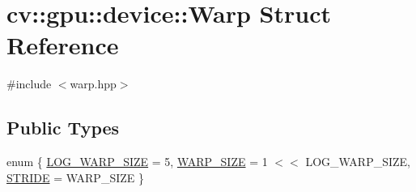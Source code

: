 \hypertarget{structcv_1_1gpu_1_1device_1_1Warp}{\section{cv\-:\-:gpu\-:\-:device\-:\-:Warp Struct Reference}
\label{structcv_1_1gpu_1_1device_1_1Warp}
}


{\ttfamily \#include $<$warp.\-hpp$>$}

\subsection*{Public Types}
\begin{DoxyCompactItemize}
\item 
enum \{ \hyperlink{structcv_1_1gpu_1_1device_1_1Warp_aad40243792fd09d3a4589e2751c91f67ae2742eb9f126ca1c5e1c775dfee90a1f}{L\-O\-G\-\_\-\-W\-A\-R\-P\-\_\-\-S\-I\-Z\-E} = 5, 
\hyperlink{structcv_1_1gpu_1_1device_1_1Warp_aad40243792fd09d3a4589e2751c91f67a5c15f55700844c8c3d7b0254964dfe36}{W\-A\-R\-P\-\_\-\-S\-I\-Z\-E} = 1 $<$$<$ L\-O\-G\-\_\-\-W\-A\-R\-P\-\_\-\-S\-I\-Z\-E, 
\hyperlink{structcv_1_1gpu_1_1device_1_1Warp_aad40243792fd09d3a4589e2751c91f67ac9a03aeacbff93618f905880a3561736}{S\-T\-R\-I\-D\-E} = W\-A\-R\-P\-\_\-\-S\-I\-Z\-E
 \}
\end{DoxyCompactItemize}
